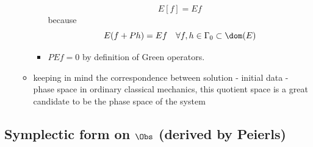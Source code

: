 \documentclass[a4paper,11pt]{scrartcl}
\begin{document}
\begin{enumerate}
\begin{itemize}
\begin{itemize}
                    $$ E[f] =  E f $$
                    because
                    $$ E(f + P h ) = E f  \quad \forall f,h \in \Gamma_0 \subset \dom(E)$$
                    \item $ P E f = 0 $ by definition of Green operators.
                \end{itemize}
                \item keeping in mind the correspondence between solution  - initial data  - phase space in ordinary classical mechanics,
                this quotient space is a great candidate  to be the phase space of the system
            \end{itemize}
    \end{enumerate}
    \subsection{Symplectic form on $\Obs$ (derived by Peierls)}
\end{document}
